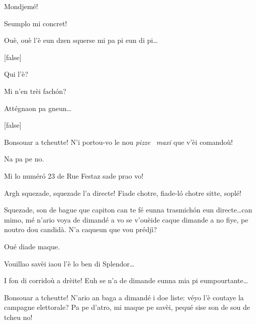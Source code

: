 \begin{drama}
\Brunospeaks {} Mondjemé!

\Jordyspeaks Seumplo mi concret!

\Brunospeaks Ouè, ouè l'è eun dzen squerse mi pa pi eun di pi\ldots

[false]


\Brunospeaks Qui l'è?

\Noteospeaks Mi n'en trèi fach\'on?

\Brunospeaks Attégnaon pa gneun\ldots

[false]


\Fattorinospeaks Bonsouar a tcheutte! N'i portou-vo le nou \textit{pizze} \pizza\ \textit{maxi} que v'èi comandoù!

\Noteospeaks Na pa pe no.

\Fattorinospeaks Mi lo num\'er\'o 23 de Rue Festaz sade prao vo!

\Brunospeaks {} Argh squezade, squezade l'a directe!  Fiade chotre, fiade-l\'o chotre sitte, soplé!


\Brunospeaks {} Squezade, son de bague que capiton can te fé eunna trasmich\'on eun directe\ldots can mimo, mé n'ario voya de dimandé a vo se v'ouèide caque dimande a no fiye, pe noutro dou candidà. N'a caqueun que vou prédjì?


 \Brunospeaks {} Oué diade maque.

\SpectIspeaks Vouillao savèi iaou l'è lo ben di Splendor\ldots

\Brunospeaks I fon di corridoù a drèite! Euh se n'a de dimande eunna mia pi eumpourtante\ldots
 

\SpectIIspeaks Bonsouar a tcheutte! N'ario an baga a di\-man\-dé i doe liste: véyo l'è coutaye la campagne elettorale? Pa pe d’atro, mi maque pe savèi, pequé sise son de sou de tcheu no!


\end{drama}
